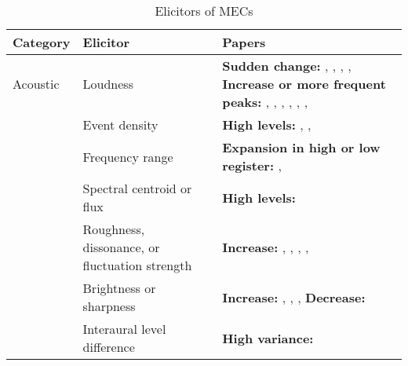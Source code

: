\begin{table}[t!]
\centering
\scriptsize
\def\arraystretch{1.2}

\begin{threeparttable}
\caption{Elicitors of MECs}
\label{tab:rev-5}

\begin{tabular*}{\textwidth}{
    >{\raggedright}p{}
    >{\raggedright}p{}
    >{\raggedright\arraybackslash}p{}}

\hline

\textbf{Category} & \textbf{Elicitor} & \textbf{Papers} \\ 

\hline
Acoustic & Loudness & 
    \textbf{Sudden change:} \textcite{auricchio2017}, \textcite{guhn2007}, \textcite{nagel2008}, \textcite{polo2017}, \textcite{sloboda1991} 
    \newline 
    \textbf{Increase or more frequent peaks:} \textcite{bannister2018}, \textcite{bannister2020b}, \textcite{beier2020}, \textcite{grewe2007}, \textcite{guhn2007}, \textcite{honda2020}, \textcite{nagel2008} \\ 

\cline{2-3}   
& Event density & 
    \textbf{High levels:} \textcite{bannister2018}, \textcite{nagel2008}, \textcite{polo2017} \\

\cline{2-3}
& Frequency range & 
    \textbf{Expansion in high or low register:} \textcite{guhn2007}, \textcite{polo2017} \\
    
\cline{2-3}
& Spectral centroid or flux & 
    \textbf{High levels:} \textcite{bannister2018} \\
    
\cline{2-3}
& Roughness, dissonance, or fluctuation strength & 
    \textbf{Increase:} \textcite{bannister2018}, \textcite{beier2020}, \textcite{grewe2007}, \textcite{nagel2008}, \textcite{park2019} \\
    
\cline{2-3}
& Brightness or sharpness & 
    \textbf{Increase:} \textcite{bannister2018}, \textcite{beier2020}, \textcite{grewe2007}, \textcite{honda2020} 
    \newline 
    \textbf{Decrease:} \textcite{bannister2020b} \\
    
\cline{2-3}
& Interaural level difference & 
    \textbf{High variance:} \textcite{honda2020} \\


\end{tabular*}
\end{threeparttable}
\end{table}
